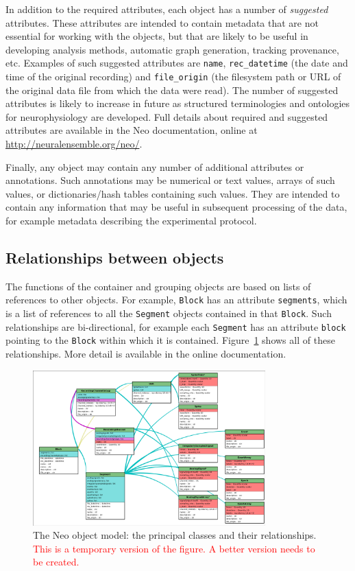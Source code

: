 \documentclass{frontiers}
\newcommand{\documentation}{\url{http://neuralensemble.org/neo/}}
\newcommand{\missing}[1]{\textcolor{red}{#1}}
\begin{document}
In addition to the required attributes, each object has a number of \emph{suggested} attributes.
These attributes are intended to contain metadata that are not essential for working with the objects, but that are likely to be useful in developing analysis methods, automatic graph generation, tracking provenance, etc.
Examples of such suggested attributes are \lstinline`name`, \lstinline`rec_datetime` (the date and time of the original recording) and \lstinline`file_origin` (the filesystem path or URL of the original data file from which the data were read).
The number of suggested attributes is likely to increase in future as structured terminologies and ontologies for neurophysiology are developed.
Full details about required and suggested attributes are available in the Neo documentation, online at \documentation.

Finally, any object may contain any number of additional attributes or annotations.
Such annotations may be numerical or text values, arrays of such values, or dictionaries/hash tables containing such values.
They are intended to contain any information that may be useful in subsequent processing of the data, for example metadata describing the experimental protocol.


\subsection{Relationships between objects}

The functions of the container and grouping objects are based on lists of references to other objects.
For example, \lstinline`Block` has an attribute \lstinline`segments`, which is a list of references to all the \lstinline`Segment` objects contained in that \lstinline`Block`.
Such relationships are bi-directional, for example each \lstinline`Segment` has an attribute \lstinline`block` pointing to the \lstinline`Block` within which it is contained.
Figure~\ref{fig:relationships} shows all of these relationships.
More detail is available in the online documentation.

\begin{figure}
\centering
\includegraphics[width=0.8\textwidth]{figures/simple_generated_diagram.png}
\caption{The Neo object model: the principal classes and their relationships. \missing{This is a temporary version of the figure. A better version needs to be created.}}\label{fig:relationships}
\end{figure}
\end{document}
